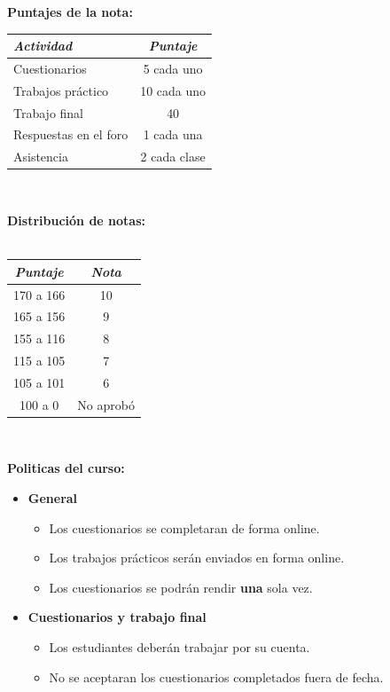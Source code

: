 \documentclass[11pt]{article}
\begin{document}
\newpage
\textbf {\large Puntajes de la nota:} \\
\begin{center}
\begin{tabular}{lc}
    \emph{Actividad} & \emph{Puntaje} \\
    \toprule
Cuestionarios & 5 cada uno\\
Trabajos práctico & 10 cada uno \\
Trabajo final & 40 \\
Respuestas en el foro & 1 cada una\\
Asistencia & 2 cada clase \\
\end{tabular} \\
\end{center}
\textbf {\large Distribuci\'on de notas:} \\\\
\begin{center}
\begin{tabular}{cc}
    \emph{Puntaje} & \emph{Nota}\\
    \toprule
    170 a 166 & 10 \\ 165 a 156 & 9 \\
    155 a 116 & 8  \\ 115 a 105 & 7 \\
    105 a 101 & 6  \\ 100 a   0 & No aprobó
\end{tabular} \\
\end{center}
\textbf {\large Politicas del curso:}
\begin{itemize}
	\item \textbf {General}
		\begin{itemize}
			\item Los cuestionarios se completaran de forma online.
            \item Los trabajos prácticos serán enviados en forma online.
			\item Los cuestionarios se podrán rendir \textbf{una} sola vez.
		\end{itemize}
	\item \textbf {Cuestionarios y trabajo final}
		\begin{itemize}
			\item Los estudiantes deberán trabajar por su cuenta.
			\item No se aceptaran los cuestionarios completados fuera de fecha.
		\end{itemize}
\end{itemize}
\end{document}
